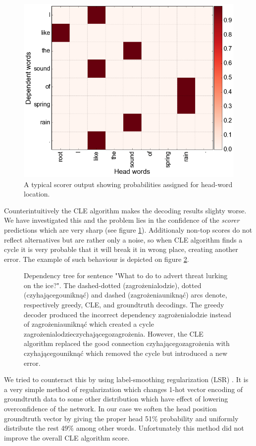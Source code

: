 \begin{figure}[!htbp]
  \centering
  \includegraphics[width=0.6\linewidth]{img/examples/cle/attention.png}
  \caption{A typical scorer output showing probabilities assigned for head-word location.} 
  \label{fig:attention}
\end{figure}

Counterintuitively the CLE algorithm makes the decoding results slighty worse.
We have investigated this and the problem lies in the confidence of the
\emph{scorer} predictions which are very sharp (see figure \ref{fig:attention}).
Additionaly non-top scores do not reflect alternatives but are rather only a noise,
so when CLE algorithm finds a cycle it is very probable that it will break it
in wrong place, creating another error. The example of such behaviour is depicted
on figure \ref{fig:cle}.

\begin{figure}[!htbp]
  \centering
  \caption{Dependency tree for sentence "What to do to advert threat lurking on the ice?".
    The dashed-dotted (zagrożenia\txtrightarrow lodzie), dotted (czyhającego\txtrightarrow uniknąć)
    and dashed (zagrożenia\txtrightarrow uniknąć) arcs denote, respectively greedy, CLE, and groundtruth decodings.
    The greedy decoder produced the incorrect dependency zagrożenia\txtrightarrow lodzie instead of
    zagrożenia\txtrightarrow uniknąć which created a cycle zagrożenia\txtrightarrow lodzie\txtrightarrow czychającego\txtrightarrow zagrożenia.
    However, the CLE algorithm replaced the good connection
    czyhającego\txtrightarrow zagrożenia with czyhającego\txtrightarrow uniknąć
    which removed the cycle but introduced a new error.} 
  \label{fig:cle}
\end{figure}

We tried to counteract this by using label-smoothing regularization (LSR)
\cite{szegedy_rethinking_2015}.
It is a very simple method of regularization which changes 1-hot vector encoding
of groundtruth data to some other distribution which have effect of lowering overconfidence
of the network. In our case we soften the head position groundtruth vector by
giving the proper head 51\% probability and uniformly distribute the rest 49\%
among other words. Unfortunately this method did not improve the overall CLE algorithm
score.

